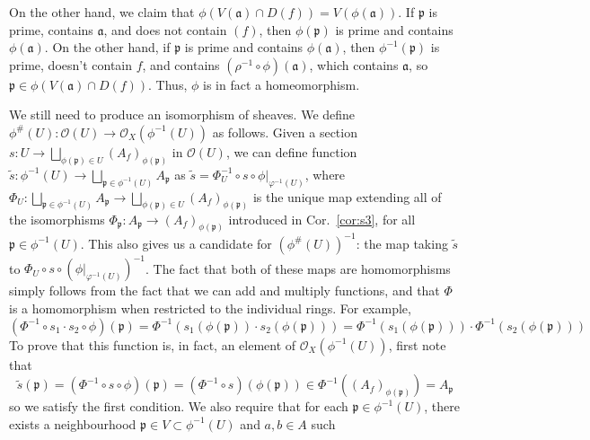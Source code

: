\documentclass[aps,pra,showpacs,notitlepage,onecolumn,superscriptaddress,nofootinbib]{revtex4-1}
\theoremstyle{definition}
\begin{document}
  On the other hand, we claim that $\phi(V(\mathfrak{a}) \cap D(f)) = V(\phi(\mathfrak{a}))$. If $\mathfrak{p}$ is prime, contains $\mathfrak{a}$, and does not contain $(f)$, then
  $\phi(\mathfrak{p})$ is prime and contains $\phi(\mathfrak{a})$. On the other hand, if $\mathfrak{p}$ is prime and contains $\phi(\mathfrak{a})$, then $\phi^{-1}(\mathfrak{p})$ is prime, doesn't contain $f$, and contains
  $(\rho^{-1} \circ \phi)(\mathfrak{a})$, which contains $\mathfrak{a}$, so $\mathfrak{p} \in \phi(V(\mathfrak{a}) \cap D(f))$. Thus, $\phi$ is in fact a homeomorphism.
  \newline

  \noindent We still need to produce an isomorphism of sheaves. We define $\phi^{\#}(U) : \mathcal{O}(U) \rightarrow \mathcal{O}_X(\phi^{-1}(U))$ as follows. Given a section
  $s : U \rightarrow \bigsqcup_{\phi(\mathfrak{p}) \in U} (A_f)_{\phi(\mathfrak{p})}$ in $\mathcal{O}(U)$, we can define function $\widetilde{s} : \phi^{-1}(U) \rightarrow \bigsqcup_{\mathfrak{p} \in \phi^{-1}(U)} A_{\mathfrak{p}}$
  as $\widetilde{s} = \Phi^{-1}_U \circ s \circ \phi|_{\varphi^{-1}(U)}$, where $\Phi_U : \bigsqcup_{\mathfrak{p} \in \phi^{-1}(U)} A_{\mathfrak{p}} \rightarrow \bigsqcup_{\phi(\mathfrak{p}) \in U} (A_f)_{\phi(\mathfrak{p})}$ is the unique map extending all of the isomorphisms
  $\Phi_{\mathfrak{p}} :  A_{\mathfrak{p}} \rightarrow (A_f)_{\phi(\mathfrak{p})}$ introduced in Cor.~\ref{cor:s3}, for all $\mathfrak{p} \in \phi^{-1}(U)$.
  This also gives us a candidate for $(\phi^{\#}(U))^{-1}$: the map taking $\widetilde{s}$ to $\Phi_U \circ s \circ (\phi|_{\varphi^{-1}(U)})^{-1}$.
  The fact that both of these maps are homomorphisms simply follows from the fact that we can add and multiply functions, and that $\Phi$ is a homomorphism when restricted to the individual rings. For example,
  \begin{equation}
    (\Phi^{-1} \circ s_1 \cdot s_2 \circ \phi)(\mathfrak{p}) = \Phi^{-1}(s_1(\phi(\mathfrak{p})) \cdot s_2(\phi(\mathfrak{p}))) = \Phi^{-1}(s_1(\phi(\mathfrak{p}))) \cdot \Phi^{-1}(s_2(\phi(\mathfrak{p})))
    \end{equation}
  To prove that this function is, in fact, an element of $\mathcal{O}_X(\phi^{-1}(U))$, first note that
  \begin{equation}
    \widetilde{s}(\mathfrak{p}) = (\Phi^{-1} \circ s \circ \phi)(\mathfrak{p}) = (\Phi^{-1} \circ s)(\phi(\mathfrak{p})) \in \Phi^{-1}((A_f)_{\phi(\mathfrak{p})}) = A_{\mathfrak{p}}
  \end{equation}
  so we satisfy the first condition. We also require that for each $\mathfrak{p} \in \phi^{-1}(U)$, there exists a neighbourhood $\mathfrak{p} \in V \subset \phi^{-1}(U)$ and $a, b \in A$ such
\end{document}

